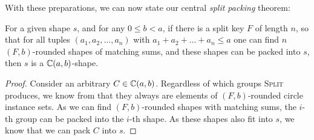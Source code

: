 

%

With these preparations, we can now state our central \emph{split packing} theorem:

\begin{theorem}\label{th:splitpack}
    For a given shape $s$, and for any $0 \le b < a$, if there is a split key $F$ of length $n$, so that for all tuples $(a_1, a_2, \dots, a_n)$ with $a_1 + a_2 + \dots + a_n \le a$
    one can find $n$ $(F,b)$-rounded shapes of matching sums,
    and these shapes can be packed into $s$, then $s$ is a $\mathbb{C}(a,b)$-shape.
\end{theorem}

\begin{proof}
    Consider an arbitrary $C \in \mathbb{C}(a,b)$. Regardless of which groups \textsc{Split} produces, we know from  that they always are elements of $(F,b)$-rounded circle instance sets.
    As we can find $(F,b)$-rounded shapes with matching sums, the $i$-th group can be packed into the $i$-th shape.
    As these shapes also fit into $s$, we know that we can pack $C$ into $s$.
\end{proof}

